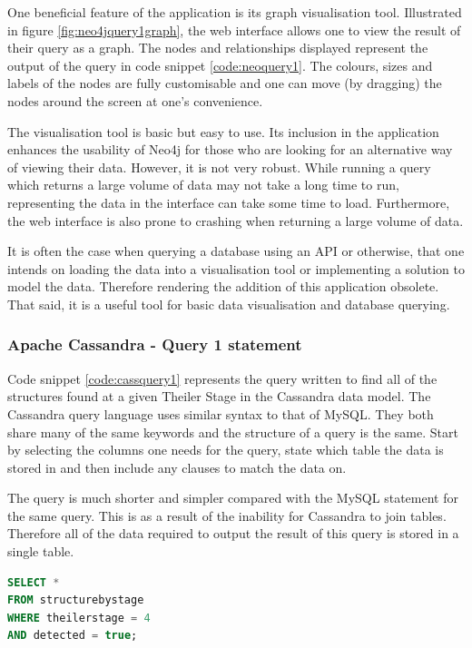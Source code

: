 One beneficial feature of the application is its graph visualisation tool. Illustrated in figure \ref{fig:neo4jquery1graph}, the web interface allows one to view the result of their query as a graph. The nodes and relationships displayed represent the output of the query in code snippet \ref{code:neoquery1}. The colours, sizes and labels of the nodes are fully customisable and one can move (by dragging) the nodes around the screen at one's convenience.

The visualisation tool is basic but easy to use. Its inclusion in the application enhances the usability of Neo4j for those who are looking for an alternative way of viewing their data. However, it is not very robust. While running a query which returns a large volume of data may not take a long time to run, representing the data in the interface can take some time to load. Furthermore, the web interface is also prone to crashing when returning a large volume of data.

It is often the case when querying a database using an API or otherwise, that one intends on loading the data into a visualisation tool or implementing a solution to model the data. Therefore rendering the addition of this application obsolete. That said, it is a useful tool for basic data visualisation and database querying.

\subsubsection*{Apache Cassandra - Query 1 statement}\label{cassquery1statement}
Code snippet \ref{code:cassquery1} represents the query written to find all of the structures found at a given Theiler Stage in the Cassandra data model. The Cassandra query language uses similar syntax to that of MySQL. They both share many of the same keywords and the structure of a query is the same. Start by selecting the columns one needs for the query, state which table the data is stored in and then include any clauses to match the data on.

The query is much shorter and simpler compared with the MySQL statement for the same query. This is as a result of the inability for Cassandra to join tables. Therefore all of the data required to output the result of this query is stored in a single table.

\begin{lstlisting}[language=SQL, caption=Cassandra query 1 statement. All structures at Theiler Stage X., label=code:cassquery1]
SELECT *
FROM structurebystage
WHERE theilerstage = 4
AND detected = true;
\end{lstlisting}

